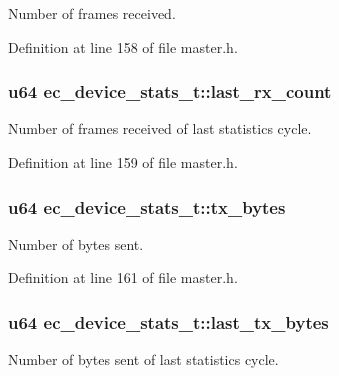 Number of frames received. 



Definition at line 158 of file master.\-h.

\subsubsection[{last\-\_\-rx\-\_\-count}]{\setlength{\rightskip}{0pt plus 5cm}u64 ec\-\_\-device\-\_\-stats\-\_\-t\-::last\-\_\-rx\-\_\-count}\label{structec__device__stats__t_af7e4fc7bfa8d67523c5e4f49b3953280}


Number of frames received of last statistics cycle. 



Definition at line 159 of file master.\-h.

\subsubsection[{tx\-\_\-bytes}]{\setlength{\rightskip}{0pt plus 5cm}u64 ec\-\_\-device\-\_\-stats\-\_\-t\-::tx\-\_\-bytes}\label{structec__device__stats__t_ac4bcb52ad4f765671ffe124f4019b370}


Number of bytes sent. 



Definition at line 161 of file master.\-h.

\subsubsection[{last\-\_\-tx\-\_\-bytes}]{\setlength{\rightskip}{0pt plus 5cm}u64 ec\-\_\-device\-\_\-stats\-\_\-t\-::last\-\_\-tx\-\_\-bytes}\label{structec__device__stats__t_ab4d135010f4b8200a252f02429bd4160}


Number of bytes sent of last statistics cycle. 



